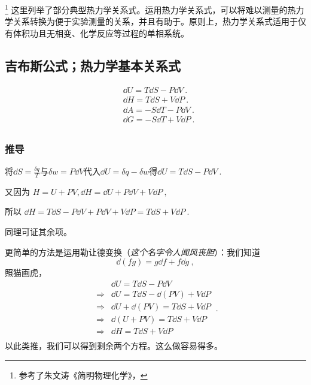 
\footnote{参考了朱文涛《简明物理化学》，}
这里列举了部分典型热力学关系式。运用热力学关系式，可以将难以测量的热力学关系转换为便于实验测量的关系，并且有助于。原则上，热力学关系式适用于仅有体积功且无相变、化学反应等过程的单相系统。

\subsection{吉布斯公式；热力学基本关系式}
\begin{align}\label{eq_MWRel_4}
&\dd U = T \dd S - P \dd V~.\\
&\dd H = T \dd S + V \dd P~.\\
&\dd A = -S \dd T - P \dd V~.\\
&\dd G = -S \dd T +V \dd P~.\\
\end{align}

\subsubsection{推导}
将$\dd S = \frac{\delta q}{T}$与$\delta w = P\dd V$代入$\dd U=\delta q-\delta w$得$\dd U = T \dd S - P \dd V~.$

又因为 $H=U+PV, \dd H = \dd U + P \dd V + V \dd P~,$

所以 $\dd H = T \dd S - P \dd V+ P \dd V + V \dd P = T \dd S + V \dd P~.$

同理可证其余项。

更简单的方法是运用勒让德变换（\textsl{这个名字令人闻风丧胆}）：我们知道
$$\dd (fg) = g \dd f + f \dd g~,$$
照猫画虎，
$$
\begin{aligned}
& \dd U = T \dd S - P \dd V \\
\Rightarrow
&\dd U = T \dd S - \dd (PV) + V \dd P \\
\Rightarrow
&\dd U + \dd (PV) =  T \dd S+ V \dd P\\
\Rightarrow
&\dd (U+PV) =  T \dd S + V \dd P\\
\Rightarrow
&\dd H = T \dd S + V \dd P\\
\end{aligned}
~.
$$
以此类推，我们可以得到剩余两个方程。这么做容易得多。

